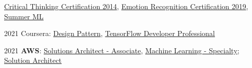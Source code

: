 

\begin{highlights}
	
	\item {
		\begin{onecolentry}
			\href{https://hmthanh.github.io/img/Critical_Thinking.jpg}{Critical Thinking Certification 2014}, \href{https://hmthanh.github.io/img/Emotion_Regconition.jpg}{Emotion Recognition Certification 2019}, \href{https://hmthanh.github.io/img/ml_summer.jpg}{Summer ML}
		\end{onecolentry}
	}
	
	\item {
		\begin{twocolentry}{2021}
			Coursera: \href{https://www.coursera.org/account/accomplishments/certificate/28JLEX5NNNUQ}{Design Pattern},
			\href{https://www.coursera.org/account/accomplishments/professional-cert/Q2B26F8Q84MZ}{TensorFlow Developer Professional}
		\end{twocolentry}
	}
	
	\item {
		\begin{twocolentry}{2021}
			\textbf{AWS}: \href{https://www.credly.com/badges/8e0316a5-2463-4d8c-aa34-76a2f6a0c1c3}{Solutions Architect - Associate},  	\href{https://www.credly.com/badges/972d23a2-e63f-4125-aebd-2d2c696f840e}{Machine Learning - Specialty}; \href{https://hmthanh.github.io/img/fpt_solution_architect_2021.png}{Solution Architect}
		\end{twocolentry}
	}
	
	
	
\end{highlights}

